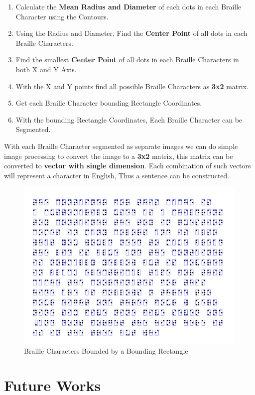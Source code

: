 \documentclass{article}
\begin{document}
\begin{enumerate}
  \item Calculate the \textbf{Mean Radius and Diameter} of each dots in each Braille Character using the Contours.
  \item Using the Radius and Diameter, Find the \textbf{Center Point} of all dots in each Braille Characters.
  \item Find the smallest \textbf{Center Point} of all dots in each Braille Characters in both X and Y Axis.
  \item With the X and Y points find all possible Braille Characters as \textbf{3x2} matrix.
  \item Get each Braille Character bounding Rectangle Coordinates.
  \item With the bounding Rectangle Coordinates, Each Braille Character can be Segmented.
\end{enumerate}

With each Braille Character segmented as separate images we can do simple image processing to convert the image to a \textbf{3x2} matrix, this matrix can be converted to \textbf{vector with single dimension}. Each combination of such vectors will represent a character in English, Thus a sentence can be constructed.


\begin{figure}[!htb]
\caption{Braille Characters Bounded by a Bounding Rectangle}
\centering
\includegraphics[scale=0.2]{rectangle}
\end{figure}

\section{Future Works}
\end{document}
